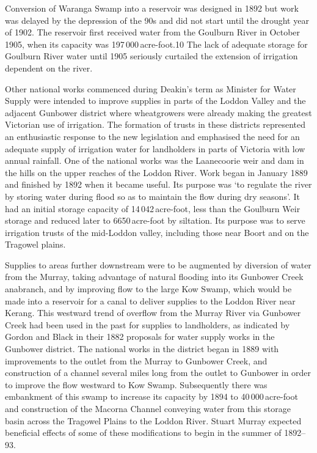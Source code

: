 Conversion of Waranga Swamp into a reservoir was designed in 1892 but
work was delayed by the depression of the 90s and did not start until
the drought year of 1902.  The reservoir first received water from the
Goulburn River in October 1905, when its capacity was
197\,000\,acre-foot.10  The lack of adequate storage for
Goulburn River water until 1905 seriously curtailed the extension of
irrigation dependent on the river.

Other national works commenced during Deakin's term as Minister for
Water Supply were intended to improve supplies in parts of the Loddon
Valley and the adjacent Gunbower district where wheatgrowers were
already making the greatest Victorian use of irrigation.
The formation of trusts in these districts represented an enthusiastic
response to the new legislation and emphasised the need for an
adequate supply of irrigation water for landholders in parts of
Victoria with low annual rainfall.  One of the national works was the
Laanecoorie weir and dam in the hills on the upper reaches of the
Loddon River.  Work began in January 1889 and finished by 1892 when it
became useful.  Its purpose was `to regulate the river by storing
water during flood so as to maintain the flow during dry
seasons'.  It had an initial storage
capacity of 14\,042\,acre-foot, less than the Goulburn Weir storage
and reduced later to 6650\,acre-foot by siltation.  Its purpose was to serve irrigation trusts of the mid-Loddon
valley, including those near Boort and on the Tragowel plains.

Supplies to areas further downstream were to be augmented by diversion
of water from the Murray, taking advantage of natural flooding into
its Gunbower Creek anabranch, and by improving flow to the large Kow
Swamp, which would be made into a reservoir for a canal to deliver
supplies to the Loddon River near Kerang.  This westward trend of overflow
from the Murray River via Gunbower Creek had been used in the past for
supplies to landholders, as indicated by Gordon and Black in their
1882 proposals for water supply works in the Gunbower district.  The
national works in the district began in 1889 with improvements to the
outlet from the Murray to Gunbower Creek, and construction of a
channel several miles long from the outlet to Gunbower in order to
improve the flow westward to Kow Swamp.  Subsequently there was
embankment of this swamp to increase its capacity by 1894 to
40\,000\,acre-foot and construction of the Macorna Channel conveying
water from this storage basin across the Tragowel Plains to the Loddon
River.
Stuart Murray expected beneficial effects of some of these
modifications to begin in the summer of 1892--93.

